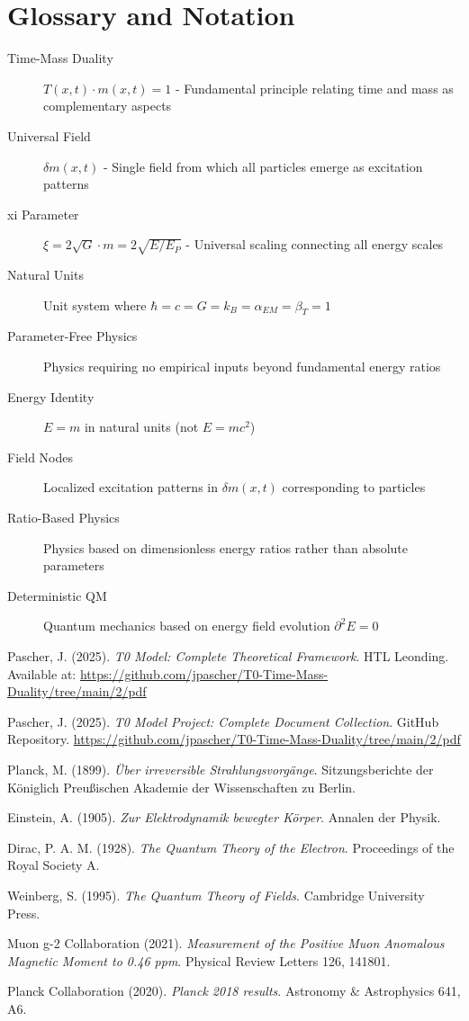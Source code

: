 \documentclass[12pt,a4paper]{report}
\begin{document}
	\chapter{Glossary and Notation}
	
	\begin{description}
		\item[Time-Mass Duality] $T(x,t) \cdot m(x,t) = 1$ - Fundamental principle relating time and mass as complementary aspects
		\item[Universal Field] $\delta m(x,t)$ - Single field from which all particles emerge as excitation patterns
		\item[xi Parameter] $\xi = 2\sqrt{G} \cdot m = 2\sqrt{E/E_P}$ - Universal scaling connecting all energy scales
		\item[Natural Units] Unit system where $\hbar = c = G = k_B = \alpha_{EM} = \beta_T = 1$
		\item[Parameter-Free Physics] Physics requiring no empirical inputs beyond fundamental energy ratios
		\item[Energy Identity] $E = m$ in natural units (not $E = mc^2$)
		\item[Field Nodes] Localized excitation patterns in $\delta m(x,t)$ corresponding to particles
		\item[Ratio-Based Physics] Physics based on dimensionless energy ratios rather than absolute parameters
		\item[Deterministic QM] Quantum mechanics based on energy field evolution $\partial^2 E = 0$
	\end{description}
	
	\begin{thebibliography}{99}
		Pascher, J. (2025). \textit{T0 Model: Complete Theoretical Framework}. HTL Leonding. Available at: \url{https://github.com/jpascher/T0-Time-Mass-Duality/tree/main/2/pdf}
		
		Pascher, J. (2025). \textit{T0 Model Project: Complete Document Collection}. GitHub Repository. \url{https://github.com/jpascher/T0-Time-Mass-Duality/tree/main/2/pdf}
		
		Planck, M. (1899). \textit{Über irreversible Strahlungsvorgänge}. Sitzungsberichte der Königlich Preußischen Akademie der Wissenschaften zu Berlin.
		
		Einstein, A. (1905). \textit{Zur Elektrodynamik bewegter Körper}. Annalen der Physik.
		
		Dirac, P. A. M. (1928). \textit{The Quantum Theory of the Electron}. Proceedings of the Royal Society A.
		
		Weinberg, S. (1995). \textit{The Quantum Theory of Fields}. Cambridge University Press.
		
		Muon g-2 Collaboration (2021). \textit{Measurement of the Positive Muon Anomalous Magnetic Moment to 0.46 ppm}. Physical Review Letters 126, 141801.
		
		Planck Collaboration (2020). \textit{Planck 2018 results}. Astronomy \& Astrophysics 641, A6.
	\end{thebibliography}
	
	
\end{document}
